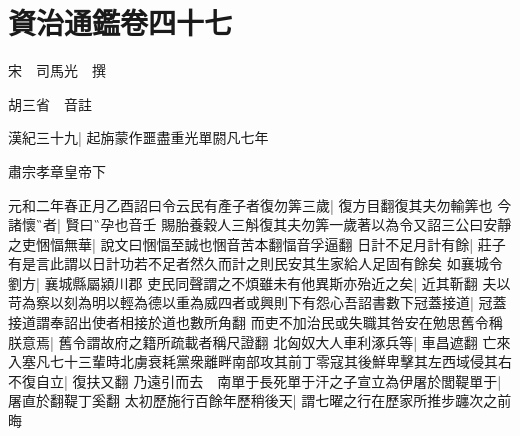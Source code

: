 \chapter{資治通鑑卷四十七}
宋　司馬光　撰

胡三省　音註

漢紀三十九|{
	起旃蒙作噩盡重光單閼凡七年}


肅宗孝章皇帝下

元和二年春正月乙酉詔曰令云民有產子者復勿筭三歲|{
	復方目翻復其夫勿輸筭也}
今諸懷者|{
	賢曰孕也音壬}
賜胎養穀人三斛復其夫勿筭一歲著以為令又詔三公曰安靜之吏悃愊無華|{
	說文曰悃愊至誠也悃音苦本翻愊音孚逼翻}
日計不足月計有餘|{
	莊子有是言此謂以日計功若不足者然久而計之則民安其生家給人足固有餘矣}
如襄城令劉方|{
	襄城縣屬潁川郡}
吏民同聲謂之不煩雖未有他異斯亦殆近之矣|{
	近其靳翻}
夫以苛為察以刻為明以輕為德以重為威四者或興則下有怨心吾詔書數下冠蓋接道|{
	冠蓋接道謂奉詔出使者相接於道也數所角翻}
而吏不加治民或失職其咎安在勉思舊令稱朕意焉|{
	舊令謂故府之籍所疏載者稱尺證翻}
北匈奴大人車利涿兵等|{
	車昌遮翻}
亡來入塞凡七十三輩時北虜衰耗黨衆離畔南部攻其前丁零寇其後鮮卑擊其左西域侵其右不復自立|{
	復扶又翻}
乃遠引而去　南單于長死單于汗之子宣立為伊屠於閭鞮單于|{
	屠直於翻鞮丁奚翻}
太初歷施行百餘年歷稍後天|{
	謂七曜之行在歷家所推步躔次之前晦}


